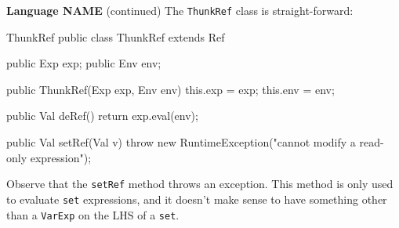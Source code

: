\begin{minipage}[t]{\sw}
\slidenumber
\LARGE
{\bf Language NAME} (continued)\exx
The \verb'ThunkRef' class is straight-forward:
\large
\begin{qv}
ThunkRef
public class ThunkRef extends Ref {

    public Exp exp;
    public Env env;

    public ThunkRef(Exp exp, Env env) {
        this.exp = exp;
        this.env = env;
    }

    public Val deRef() {
        return exp.eval(env);
    }

    public Val setRef(Val v) {
        throw new RuntimeException("cannot modify a read-only expression");
    }
}
\end{qv}
\LARGE
Observe that the \verb'setRef' method throws an exception.
This method is only used to evaluate \verb'set' expressions,
and it doesn't make sense to have
something other than a \verb'VarExp' on the LHS of a \verb'set'.
\end{minipage}
\clearpage
